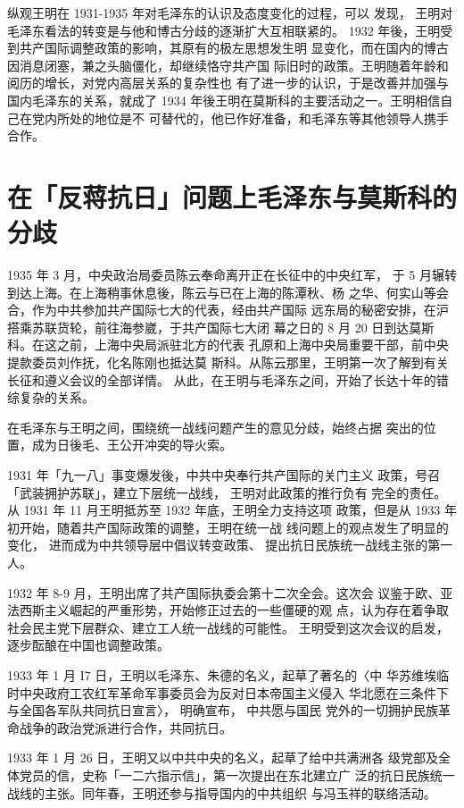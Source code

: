 纵观王明在 1931-1935 年对毛泽东的认识及态度变化的过程，可以
发现，
王明对毛泽东看法的转变是与他和博古分歧的逐渐扩大互相联紧的。
1932 年後，王明受到共产国际调整政策的影响，其原有的极左思想发生明
显变化，而在国内的博古因消息闭塞，兼之头脑僵化，却继续恪守共产国
际旧时的政策。王明随着年龄和阅历的增长，对党内高层关系的复杂性也
有了进一步的认识，于是改善并加强与国内毛泽东的关系，就成了 1934
年後王明在莫斯科的主要活动之一。王明相信自己在党内所处的地位是不
可替代的，他已作好准备，和毛泽东等其他领导人携手合作。

\section{在「反蒋抗日」问题上毛泽东与莫斯科的分歧}

1935 年 3 月，中央政治局委员陈云奉命离开正在长征中的中央红军，
于 5 月辗转到达上海。在上海稍事休息後，陈云与已在上海的陈潭秋、杨
之华、何实山等会合，作为中共参加共产国际七大的代表，经由共产国际
远东局的秘密安排，在沪搭乘苏联货轮，前往海参崴，于共产国际七大闭
幕之日的 8 月 20 日到达莫斯科。在这之前，上海中央局派驻北方的代表
孔原和上海中央局重要干部，前中央提款委员刘作抚，化名陈刚也抵达莫
斯科。从陈云那里，王明第一次了解到有关长征和遵义会议的全部详情。
从此，在王明与毛泽东之间，开始了长达十年的错综复杂的关系。

在毛泽东与王明之间，围绕统一战线问题产生的意见分歧，始终占据
突出的位置，成为日後毛、王公开冲突的导火索。

1931 年「九一八」事变爆发後，中共中央奉行共产国际的关门主义
政策，号召「武装拥护苏联」，建立下层统一战线，
王明对此政策的推行负有
完全的责任。从 1931 年 11 月王明抵苏至 1932 年底，王明全力支持这项
政策，但是从 1933 年初开始，随着共产国际政策的调整，王明在统一战
线问题上的观点发生了明显的变化，
进而成为中共领导层中倡议转变政策、
提出抗日民族统一战线主张的第一人。

1932 年 8-9 月，王明出席了共产国际执委会第十二次全会。这次会
议鉴于欧、亚法西斯主义崛起的严重形势，开始修正过去的一些僵硬的观
点，认为存在着争取社会民主党下层群众、建立工人统一战线的可能性。
王明受到这次会议的启发，逐步酝酿在中国也调整政策。

1933 年 1 月 I7 日，王明以毛泽东、朱德的名义，起草了著名的〈中
华苏维埃临时中央政府工农红军革命军事委员会为反对日本帝国主义侵入
华北愿在三条件下与全国各军队共同抗日宣言〉， 明确宣布，
中共愿与国民
党外的一切拥护民族革命战争的政治党派进行合作，共同抗日。

1933 年 1 月 26 日，王明又以中共中央的名义，起草了给中共满洲各
级党部及全体党员的信，史称「一二六指示信」，第一次提出在东北建立广
泛的抗日民族统一战线的主张。同年春，王明还参与指导国内的中共组织
与冯玉祥的联络活动。

